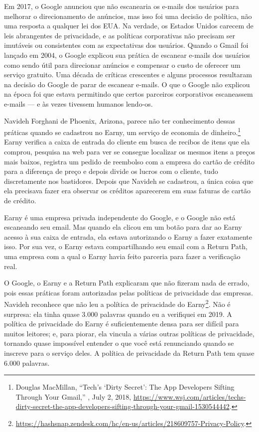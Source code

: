 Em 2017, o Google anunciou que não escanearia os e-mails dos usuários para melhorar o
direcionamento de anúncios, mas isso foi uma decisão de política, não uma resposta a qualquer
lei dos EUA. Na verdade, os Estados Unidos carecem de leis abrangentes de privacidade, e as
políticas corporativas não precisam ser imutáveis ou consistentes com as expectativas dos
usuários. Quando o Gmail foi lançado em 2004, o Google explicou sua prática de escanear e-mails
dos usuários como sendo útil para direcionar anúncios e compensar o custo de oferecer um
serviço gratuito. Uma década de críticas crescentes e alguns processos resultaram na decisão
do Google de parar de escanear e-mails. O que o Google não explicou na época foi que estava
permitindo que certos parceiros corporativos escaneassem e-mails --- e às vezes tivessem humanos
lendo-os.

Navideh Forghani de Phoenix, Arizona, parece não ter conhecimento dessas práticas quando se
cadastrou no Earny, um serviço de economia de dinheiro.\footnote{Douglas MacMillan, ``Tech’s
`Dirty Secret': The App Developers Sifting Through Your Gmail,'' ,
July 2, 2018,
\url{https://www.wsj.com/articles/techs-dirty-secret-the-app-developers-sifting-through-your-gmail-1530544442}.}
Earny verifica a caixa de entrada do cliente em busca de recibos de itens que ela comprou,
pesquisa na web para ver se consegue localizar os mesmos itens a preços mais baixos, registra
um pedido de reembolso com a empresa do cartão de crédito para a diferença de preço e depois
divide os lucros com o cliente, tudo discretamente nos bastidores. Depois que Navideh se
cadastrou, a única coisa que ela precisava fazer era observar os créditos aparecerem em suas
faturas de cartão de crédito.

Earny é uma empresa privada independente do Google, e o Google não está escaneando seu email.
Mas quando ela clicou em um botão para dar ao Earny acesso à sua caixa de entrada, ela estava
autorizando o Earny a fazer exatamente isso. Por sua vez, o Earny estava compartilhando seu
email com a Return Path, uma empresa com a qual o Earny havia feito parceria para fazer a
verificação real.

O Google, o Earny e a Return Path explicaram que não fizeram nada de errado, pois essas
práticas foram autorizadas pelas políticas de privacidade das empresas. Navideh reconhece que
não leu a política de privacidade do Earny\footnote{\url{https://hashsnap.zendesk.com/hc/en-us/articles/218609757-Privacy-Policy}.}.
Não é surpresa: ela tinha quase 3.000 palavras quando eu a verifiquei em 2019. A política de
privacidade do Earny é suficientemente densa para ser difícil para muitos leitores; e, para
piorar, ela vincula a várias outras políticas de privacidade, tornando quase impossível
entender o que você está renunciando quando se inscreve para o serviço deles. A política de
privacidade da Return Path tem quase 6.000 palavras.

